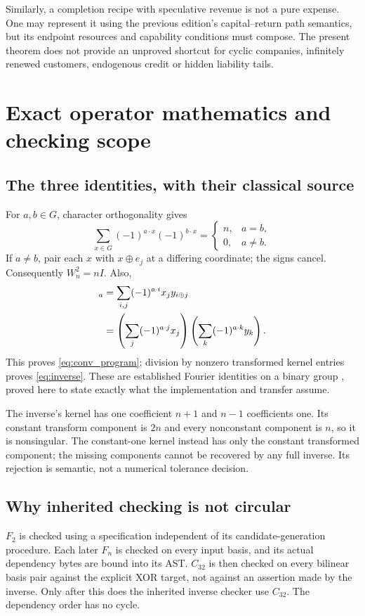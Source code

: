 \documentclass[11pt,letterpaper]{article}
\theoremstyle{definition}\newtheorem{definition}[theorem]{Definition}
\theoremstyle{remark}\newtheorem{remark}[theorem]{Remark}
\begin{document}
Similarly, a completion recipe with speculative revenue is not a pure expense. One may represent it using the previous edition's capital--return path semantics, but its endpoint resources and capability conditions must compose. The present theorem does not provide an unproved shortcut for cyclic companies, infinitely renewed customers, endogenous credit or hidden liability tails.

\section{Exact operator mathematics and checking scope}
\subsection{The three identities, with their classical source}
For $a,b\in G$, character orthogonality gives
\begin{equation}
 \sum_{x\in G}(-1)^{a\cdot x}(-1)^{b\cdot x}
 =\begin{cases}n,&a=b,\\0,&a\ne b.\end{cases}
\end{equation}
If $a\ne b$, pair each $x$ with $x\oplus e_j$ at a differing coordinate; the signs cancel. Consequently $W_n^2=nI$. Also,
\begin{align}
 [F_n(x\star y)]_a
 &=\sum_{i,j}(-1)^{a\cdot i}x_jy_{i\oplus j}\notag\\
 &=\left(\sum_j(-1)^{a\cdot j}x_j\right)
   \left(\sum_k(-1)^{a\cdot k}y_k\right).
\end{align}
This proves \eqref{eq:conv_program}; division by nonzero transformed kernel entries proves \eqref{eq:inverse}. These are established Fourier identities on a binary group \cite{odonnell}, proved here to state exactly what the implementation and transfer assume.

The inverse's kernel has one coefficient $n+1$ and $n-1$ coefficients one. Its constant transform component is $2n$ and every nonconstant component is $n$, so it is nonsingular. The constant-one kernel instead has only the constant transformed component; the missing components cannot be recovered by any full inverse. Its rejection is semantic, not a numerical tolerance decision.

\subsection{Why inherited checking is not circular}
$F_2$ is checked using a specification independent of its candidate-generation procedure. Each later $F_n$ is checked on every input basis, and its actual dependency bytes are bound into its AST. $C_{32}$ is then checked on every bilinear basis pair against the explicit XOR target, not against an assertion made by the inverse. Only after this does the inherited inverse checker use $C_{32}$. The dependency order has no cycle.
\end{document}
